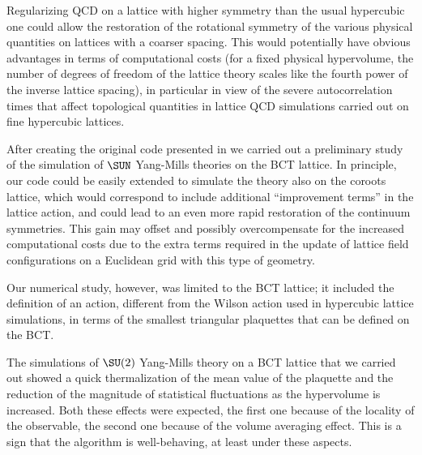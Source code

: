 Regularizing QCD on a lattice with higher symmetry than the usual hypercubic one could allow the restoration of the rotational symmetry of the various physical quantities on lattices with a coarser spacing.
This would potentially have obvious advantages in terms of computational costs (for a fixed physical hypervolume, the number of degrees of freedom of the lattice theory scales like the fourth power of the inverse lattice spacing), in particular in view of the severe autocorrelation times that affect topological quantities in lattice QCD simulations carried out on fine hypercubic lattices.

After creating the original code presented in  we carried out a preliminary study of the simulation of $\SUN$ Yang-Mills theories on the BCT lattice.
In principle, our code could be easily extended to simulate the theory also on the \spFtext coroots lattice, which would correspond to include additional ``improvement terms'' in the lattice action, and could lead to an even more rapid restoration of the continuum symmetries.
This gain may offset and possibly overcompensate for the increased computational costs due to the extra terms required in the update of lattice field configurations on a Euclidean grid with this type of geometry.

Our numerical study, however, was limited to the BCT lattice; it included the definition of an action, different from the Wilson action used in hypercubic lattice simulations, in terms of the smallest triangular plaquettes that can be defined on the BCT.

The simulations of $\SU(2)$ Yang-Mills theory on a BCT lattice that we carried out showed a quick thermalization of the mean value of the plaquette and the reduction of the magnitude of statistical fluctuations as the hypervolume is increased.
Both these effects were expected, the first one because of the locality of the observable, the second one because of the volume averaging effect.
This is a sign that the algorithm is well-behaving, at least under these aspects.

